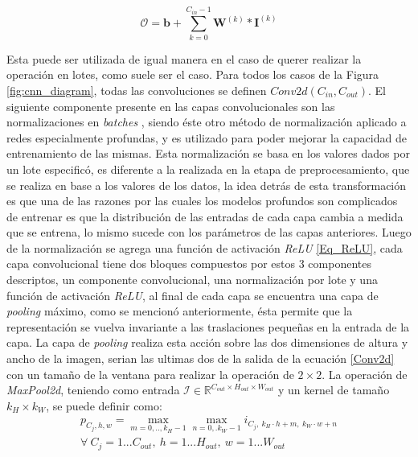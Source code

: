 \documentclass[spanish]{article}
\theoremstyle{definition}
\theoremstyle{remark}
\numberwithin{equation}{section}
\numberwithin{equation}{section} %
\begin{document}
\begin{equation}
\label{Conv2d}
\mathcal{O}=\boldsymbol{b}+\sum^{C_{in}-1}_{k=0}\boldsymbol{W}^{(k)}*\boldsymbol{I}^{(k)} 
\end{equation} \par
Esta puede ser utilizada de igual manera en el caso de querer realizar la operación en lotes, como suele ser el caso. Para todos los casos de la Figura \ref{fig:cnn_diagram}, todas las convoluciones se definen $Conv2d(C_{in},C_{out})$. El siguiente componente presente en las capas convolucionales son las normalizaciones en \textit{batches} \cite{ioffe2015batch}, siendo éste otro método de normalización aplicado a redes especialmente profundas, y es utilizado para poder mejorar la capacidad de entrenamiento de las mismas. Esta normalización se basa en los valores dados por un lote especificó, es diferente a la realizada en la etapa de preprocesamiento, que se realiza en base a los valores de los datos, la idea detrás de esta transformación es que una de las razones por las cuales los modelos profundos son complicados de entrenar es que la distribución de las entradas de cada capa cambia a medida que se entrena, lo mismo sucede con los parámetros de las capas anteriores. Luego de la normalización se agrega una función de activación \textit{ReLU} \eqref{Eq_ReLU}, cada capa convolucional tiene dos bloques compuestos por estos 3 componentes descriptos, un componente convolucional, una normalización por lote y una función de activación \textit{ReLU}, al final de cada capa se encuentra una capa de \textit{pooling} máximo, como se mencionó anteriormente, ésta permite que la representación se vuelva invariante a las traslaciones pequeñas en la entrada de la capa. La capa de \textit{pooling} realiza esta acción sobre las dos dimensiones de altura y ancho de la imagen, serian las ultimas dos de la salida de la ecuación \eqref{Conv2d} con un tamaño de la ventana para realizar la operación de $2\times2$. La operación de \textit{MaxPool2d}, teniendo como entrada  $\mathcal{I} \in \mathbb{R}^{C_{out} \times H_{out} \times W_{out}}$ y un kernel de tamaño $k_H\times k_W$, se puede definir como:
\begin{equation}
\label{MaxPool2d}
\begin{split}
p_{C_j,h,w}=\max_{m=0,..,k_H-1}  \max_{n=0,.k_W-1}i_{C_j,\ k_H  \cdot  h  + m, \ k_W  \cdot  w   +n} \\
\forall \ C_j = 1...C_{out} ,\ h=1...H_{out} 	,\ w=1...W_{out}
\end{split}
\end{equation} \par
\end{document}

